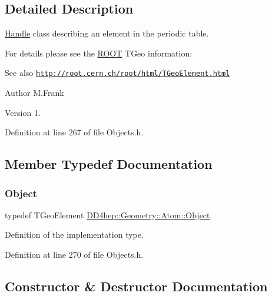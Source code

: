 \subsection{Detailed Description}
\hyperlink{class_d_d4hep_1_1_handle}{Handle} class describing an element in the periodic table. 

For details please see the \hyperlink{namespace_r_o_o_t}{R\+O\+OT} T\+Geo information\+: \begin{DoxySeeAlso}{See also}
\href{http://root.cern.ch/root/html/TGeoElement.html}{\tt http\+://root.\+cern.\+ch/root/html/\+T\+Geo\+Element.\+html}
\end{DoxySeeAlso}
\begin{DoxyAuthor}{Author}
M.\+Frank 
\end{DoxyAuthor}
\begin{DoxyVersion}{Version}
1. 
\end{DoxyVersion}


Definition at line 267 of file Objects.\+h.



\subsection{Member Typedef Documentation}
\hypertarget{class_d_d4hep_1_1_geometry_1_1_atom_a9fdd9fe52048018b3cba23bc9fb855fd}{}\label{class_d_d4hep_1_1_geometry_1_1_atom_a9fdd9fe52048018b3cba23bc9fb855fd} 
\subsubsection{\texorpdfstring{Object}{Object}}
{\footnotesize\ttfamily typedef T\+Geo\+Element \hyperlink{class_d_d4hep_1_1_geometry_1_1_atom_a9fdd9fe52048018b3cba23bc9fb855fd}{D\+D4hep\+::\+Geometry\+::\+Atom\+::\+Object}}



Definition of the implementation type. 



Definition at line 270 of file Objects.\+h.



\subsection{Constructor \& Destructor Documentation}
\hypertarget{class_d_d4hep_1_1_geometry_1_1_atom_ac4b6668ca1e8fc3b021642f398f74d03}{}\label{class_d_d4hep_1_1_geometry_1_1_atom_ac4b6668ca1e8fc3b021642f398f74d03} 
